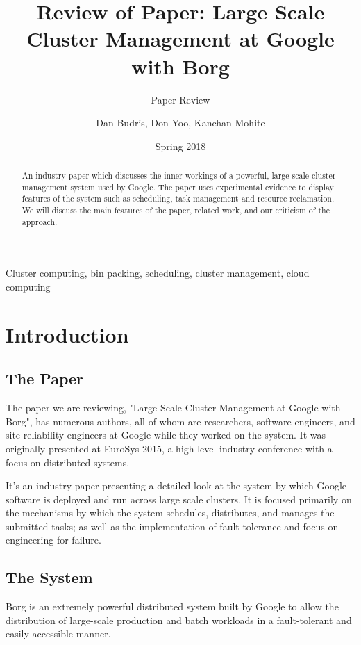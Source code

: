 \documentclass[runningheads,a4paper]{llncs}
\newcommand{\keywords}[1]{\par\addvspace\baselineskip
\noindent\keywordname\enspace\ignorespaces#1}
\begin{document}
\mainmatter

\title{Review of Paper: Large Scale Cluster Management at Google with Borg }
\subtitle{Paper Review }
\date{Spring 2018}

\author{Dan Budris, Don Yoo, Kanchan Mohite}


\maketitle
\begin{abstract}
An industry paper which discusses the inner workings of a powerful, large-scale cluster management system used by Google.  The paper uses experimental evidence to display features of the system such as scheduling, task management and resource reclamation.  We will discuss the main features of the paper, related work, and our criticism of the approach.
\end{abstract}

\keywords{Cluster computing, bin packing, scheduling, cluster management, cloud computing}

\section{Introduction}
\subsection{The Paper}
The paper we are reviewing, "Large Scale Cluster Management at Google with Borg",   has numerous authors, all of whom are researchers, software engineers, and site reliability engineers at Google while they worked on the system.  It was originally presented at EuroSys 2015, a high-level industry conference with a focus on distributed systems.  

It’s an industry paper presenting a detailed look at the system by which Google software is deployed and run across large scale clusters.  It is focused primarily on the mechanisms by which the system schedules, distributes, and manages the submitted tasks; as well as the implementation of fault-tolerance and focus on engineering for failure.

\subsection{The System}
Borg is an extremely powerful distributed system built by Google to allow the distribution of large-scale production and batch workloads in a fault-tolerant and easily-accessible manner.  
\end{document}
